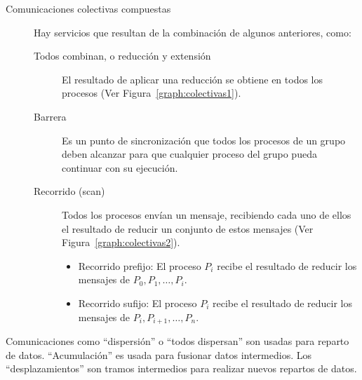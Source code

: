 \begin{description}
    \item [Comunicaciones colectivas compuestas] Hay servicios que resultan de la combinación de algunos anteriores, como:
        \begin{description}
            \item [Todos combinan, o reducción y extensión] El resultado de aplicar una reducción se obtiene en todos los procesos (Ver Figura~\ref{graph:colectivas1}).
            \item [Barrera] Es un punto de sincronización que todos los procesos de un grupo deben alcanzar para que cualquier proceso del grupo pueda continuar con su ejecución.
            \item [Recorrido (scan)] Todos los procesos envían un mensaje, recibiendo cada uno de ellos el resultado de reducir un conjunto de estos mensajes (Ver Figura~\ref{graph:colectivas2}).
                \begin{itemize}
                    \item Recorrido prefijo: El proceso $P_i$ recibe el resultado de reducir los mensajes de $P_0, P_1, \ldots, P_i$.
                    \item Recorrido sufijo: El proceso $P_i$ recibe el resultado de reducir los mensajes de $P_i, P_{i+1}, \ldots, P_n$.
                \end{itemize}
        \end{description}
\end{description}

Comunicaciones como ``dispersión'' o ``todos dispersan'' son usadas para reparto de datos. ``Acumulación'' es usada para fusionar datos intermedios. Los ``desplazamientos'' son tramos intermedios para realizar nuevos repartos de datos.\\


